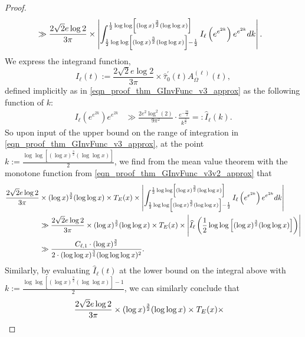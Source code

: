 \documentclass[11pt,reqno,a4letter]{article}
\numberwithin{figure}{section}
\numberwithin{table}{section}
\theoremstyle{plain}
\numberwithin{theorem}{section}
\theoremstyle{definition}
\newcommand{\SuccSim}[0]{\overset{_{\scriptsize{\blacktriangle}}}{\succsim}}
\renewcommand{\SuccSim}[0]{\ensuremath{\gg}}
\begin{document}
\begin{proof}
\begin{align}
\notag 
     & \gg 
     \frac{2\sqrt{2} e \log 2}{3\pi} \times 
     \left\lvert 
     \int_{\frac{1}{2} \log\log\left[(\log x)^{\frac{3}{2}} (\log\log x)\right]-\frac{1}{2}}^{ 
     \frac{1}{2} \log\log\left[(\log x)^{\frac{3}{2}} (\log\log x)\right]} 
     I_{\ell}\left(e^{e^{2k}}\right) 
     e^{e^{2k}} dk \right\rvert. 
\end{align} 
We express the integrand function, 
$$I_{\ell}(t) := \frac{2\sqrt{2} e \log 2}{3\pi} \times 
  \widehat{\tau}_0^{\prime}(t) A_{\Omega}^{(\ell)}(t),$$ 
defined implicitly as in \eqref{eqn_proof_thm_GInvFunc_v3_approx} as the following function of $k$: 
\begin{align} 
\label{eqn_proof_thm_GInvFunc_v3v2_approx} 
I_{\ell}\left(e^{e^{2k}}\right) e^{e^{2k}}& \SuccSim 
     \frac{2 e^2 \log^2(2)}{9 \pi^2} \cdot \frac{e^{-\frac{3k}{2}}}{k^{\frac{3}{2}}} 
     =: \widehat{I}_{\ell}(k). 
\end{align} 
So upon input of the upper bound on the range of integration in 
\eqref{eqn_proof_thm_GInvFunc_v3_approx}, at the point 
$k := \frac{\log\log\left[(\log x)^{\frac{3}{2}} (\log\log x)\right]}{2}$, 
we find from the mean value theorem with the monotone function 
from \eqref{eqn_proof_thm_GInvFunc_v3v2_approx} that 
\begin{align} 
\notag 
\frac{2\sqrt{2} e \log 2}{3\pi} & \times (\log x)^{\frac{3}{2}} (\log\log x) \times T_E(x) \times 
     \left\lvert 
     \int_{\frac{1}{2} \log\log\left[(\log x)^{\frac{3}{2}} (\log\log x)\right] - 
     \frac{1}{2}}^{\frac{1}{2} \log\log\left[(\log x)^{\frac{3}{2}} (\log\log x)\right]} 
     I_{\ell}\left(e^{e^{2k}}\right) 
     e^{e^{2k}} dk \right\rvert \\ 
\notag 
     & \gg \frac{2\sqrt{2} e \log 2}{3\pi} \times (\log x)^{\frac{3}{2}} (\log\log x) \times T_E(x) \times 
     \Biggl\lvert 
     \widehat{I}_{\ell}\left(\frac{1}{2} \log\log\left[(\log x)^{\frac{3}{2}} (\log\log x)\right]\right)
     \Biggr\rvert \\ 
\label{eqn_proof_thm_GInvFunc_v4_approx} 
     & \gg \frac{C_{\ell,1} \cdot (\log x)^{\frac{3}{2}}}{2 \cdot  
     (\log\log x)^{\frac{3}{4}} (\log\log\log x)^2}. 
\end{align} 
Similarly, by evaluating $\widehat{I}_{\ell}(t)$ at the 
lower bound on the integral above with 
$k := \frac{\log\log\left[(\log x)^{\frac{3}{2}} (\log\log x)\right] - 1}{2}$, we can similarly conclude that 
\begin{align} 
\notag 
\frac{2\sqrt{2} e \log 2}{3\pi} & \times (\log x)^{\frac{3}{2}} (\log\log x) \times T_E(x) \times 

\end{align}
\end{proof}
\end{document}

